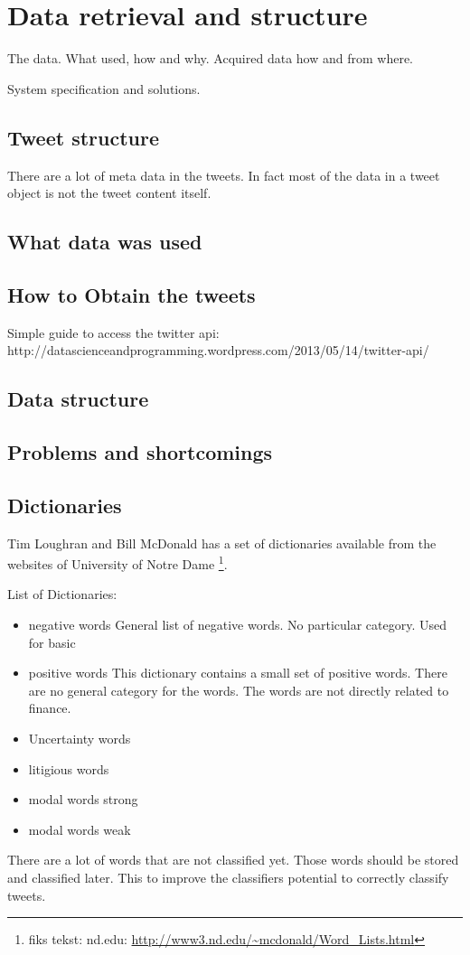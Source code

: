 \chapter{Data retrieval and structure}
The data. What used, how and why. Acquired data how and from where. 

System specification and solutions. 

\section{Tweet structure}
There are a lot of meta data in the tweets. In fact most of the data in a tweet
object is not the tweet content itself. 

\section{What data was used}
\section{How to Obtain the tweets}
Simple guide to access the twitter api:  http://datascienceandprogramming.wordpress.com/2013/05/14/twitter-api/

\section{Data structure}
\section{Problems and shortcomings}

\section{Dictionaries}\label{sec:dict}

Tim Loughran and Bill McDonald has a set of dictionaries available from the
websites of University of Notre Dame \footnote{fiks tekst: nd.edu:
\url{http://www3.nd.edu/~mcdonald/Word_Lists.html}}. 

List of Dictionaries:
\begin{itemize}
    \item negative words
General list of negative words. No particular category. Used for basic   
    \item positive words
This dictionary contains a small set of positive words. There are no general
category for the words. The words are not directly related to finance. 
    \item Uncertainty words
    \item litigious words
    \item modal words strong
    \item modal words weak
\end{itemize}

There are a lot of words that are not classified yet. Those words should be
stored and classified later. This to improve the classifiers potential to
correctly classify tweets.  

